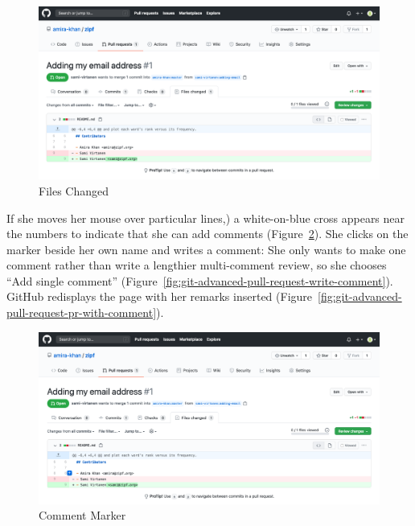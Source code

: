 \documentclass[
]{krantz}
\begin{document}
\begin{figure}

{\centering \includegraphics[width=1\linewidth]{figures/git-advanced/pr-changes} 

}

\caption{Files Changed}\label{fig:git-advanced-pull-request-changes}
\end{figure}

If she moves her mouse over particular lines,)
a white-on-blue cross appears near the numbers to indicate that she can add comments
(Figure~\ref{fig:git-advanced-pull-request-comment-marker}).
She clicks on the marker beside her own name and writes a comment:
She only wants to make one comment rather than write a lengthier multi-comment review,
so she chooses ``Add single comment''
(Figure~\ref{fig:git-advanced-pull-request-write-comment}).
GitHub redisplays the page with her remarks inserted
(Figure~\ref{fig:git-advanced-pull-request-pr-with-comment}).

\begin{figure}

{\centering \includegraphics[width=1\linewidth]{figures/git-advanced/pr-comment-marker} 

}

\caption{Comment Marker}\label{fig:git-advanced-pull-request-comment-marker}
\end{figure}
\end{document}
